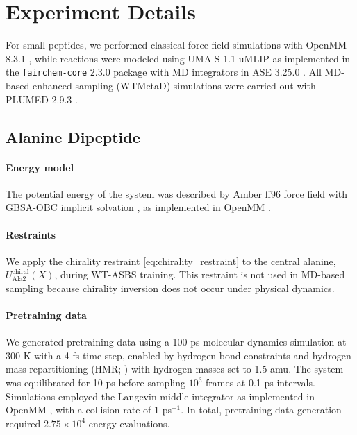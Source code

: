 \documentclass[]{fairmeta}
\theoremstyle{remark}
\begin{document}
\section{Experiment Details}
\label{sec:experiment_details}

For small peptides, we performed classical force field simulations with OpenMM 8.3.1 \citep{eastman2023openmm}, while reactions were modeled using UMA-S-1.1 uMLIP \citep{wood2025uma} as implemented in the \texttt{fairchem-core} 2.3.0 package \citep{fairchem} with MD integrators in ASE 3.25.0 \citep{larsen2017atomic}.
All MD-based enhanced sampling (WTMetaD) simulations were carried out with PLUMED 2.9.3 \citep{tribello2014plumed,plumed2019promoting}.

\subsection{Alanine Dipeptide}
\paragraph{Energy model}
The potential energy of the system was described by
Amber ff96 force field \citep{kollman1997development} with GBSA-OBC implicit solvation \citep{onufriev2004exploring}, as implemented in OpenMM \citep{eastman2023openmm}.

\paragraph{Restraints}
We apply the chirality restraint \cref{eq:chirality_restraint} to the central alanine, $U_\text{Ala2}^\text{chiral}(X)$, during WT-ASBS training.
This restraint is not used in MD-based sampling because chirality inversion does not occur under physical dynamics.

\paragraph{Pretraining data}
We generated pretraining data using a 100 ps molecular dynamics simulation at 300 K with a 4 fs time step, enabled by hydrogen bond constraints and hydrogen mass repartitioning (HMR; \citet{hopkins2015long}) with hydrogen masses set to 1.5 amu.
The system was equilibrated for 10 ps before sampling $10^3$ frames at 0.1 ps intervals.
Simulations employed the Langevin middle integrator \citep{zhang2019unified} as implemented in OpenMM \citep{eastman2023openmm}, with a collision rate of 1 ps$^{-1}$.
In total, pretraining data generation required $2.75 \times 10^4$ energy evaluations.
\end{document}
